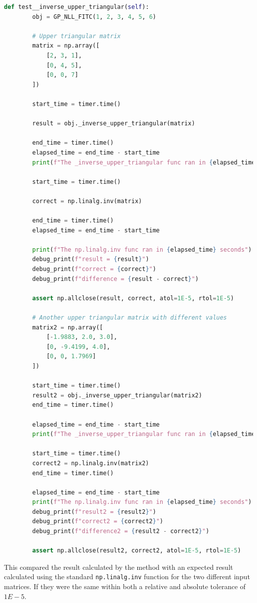 \documentclass[12pt]{article}
\begin{document}
    \begin{lstlisting}[language=Python]
    def test__inverse_upper_triangular(self):
        obj = GP_NLL_FITC(1, 2, 3, 4, 5, 6)

        # Upper triangular matrix
        matrix = np.array([
            [2, 3, 1],
            [0, 4, 5],
            [0, 0, 7]
        ])

        start_time = timer.time()

        result = obj._inverse_upper_triangular(matrix)

        end_time = timer.time()
        elapsed_time = end_time - start_time
        print(f"The _inverse_upper_triangular func ran in {elapsed_time} seconds")

        start_time = timer.time()

        correct = np.linalg.inv(matrix)

        end_time = timer.time()
        elapsed_time = end_time - start_time

        print(f"The np.linalg.inv func ran in {elapsed_time} seconds")
        debug_print(f"result = {result}")
        debug_print(f"correct = {correct}")
        debug_print(f"difference = {result - correct}")

        assert np.allclose(result, correct, atol=1E-5, rtol=1E-5)

        # Another upper triangular matrix with different values
        matrix2 = np.array([
            [-1.9883, 2.0, 3.0],
            [0, -9.4199, 4.0],
            [0, 0, 1.7969]
        ])

        start_time = timer.time()
        result2 = obj._inverse_upper_triangular(matrix2)
        end_time = timer.time()

        elapsed_time = end_time - start_time
        print(f"The _inverse_upper_triangular func ran in {elapsed_time} seconds")

        start_time = timer.time()
        correct2 = np.linalg.inv(matrix2)
        end_time = timer.time()

        elapsed_time = end_time - start_time
        print(f"The np.linalg.inv func ran in {elapsed_time} seconds")
        debug_print(f"result2 = {result2}")
        debug_print(f"correct2 = {correct2}")
        debug_print(f"difference2 = {result2 - correct2}")

        assert np.allclose(result2, correct2, atol=1E-5, rtol=1E-5)
    \end{lstlisting}


    This compared the result calculated by the method with an expected result calculated using the standard \texttt{np.linalg.inv} function for the two different input matrices.
    If they were the same within both a relative and absolute tolerance of $1E-5.$
\end{document}
